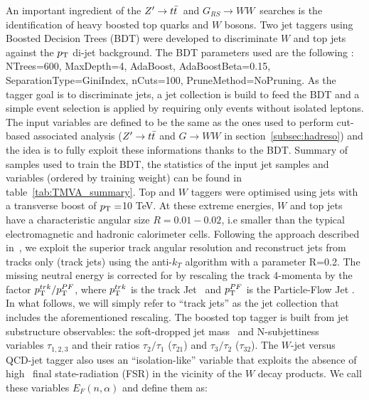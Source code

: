 \documentclass{cernrep}
\newcommand*{\zptt}{\ensuremath{Z^{\prime} \rightarrow \ttbar}}
\newcommand*{\rsg}{\ensuremath{G_{RS} \rightarrow WW}}
\begin{document}
An important ingredient of the \zptt\ and \rsg\ searches is the identification of heavy boosted top quarks and $W$ bosons. Two jet taggers using Boosted Decision Trees (BDT) were developed to discriminate $W$ and top jets against the $p_{\text{T}}$ di-jet background.
\newline
The BDT parameters used are the following : NTrees=600, MaxDepth=4, AdaBoost, AdaBoostBeta=0.15, SeparationType=GiniIndex, nCuts=100, PruneMethod=NoPruning. As the tagger goal is to discriminate jets, a jet collection is build to feed the BDT and a simple event selection is applied by requiring only events without isolated leptons.
The input variables are defined to be the same as the ones used to perform cut-based associated analysis ($Z^{\prime} \rightarrow t\bar{t}$ and $G \rightarrow WW$ in section~\ref{subsec:hadreso}) and the idea is to fully exploit these informations thanks to the BDT. Summary of samples used to train the BDT, the statistics of the input jet samples and variables (ordered by training weight) can be found in table~\ref{tab:TMVA_summary}.
\newline
Top and $W$ taggers were optimised using jets with a transverse boost of $p_{\text{T}}=$10 TeV. At these extreme energies, $W$ and top jets have a characteristic angular size $R=0.01-0.02$, i.e smaller than the typical electromagnetic and hadronic calorimeter cells. Following the approach described in~\cite{Larkoski:2015yqa}, we exploit the superior track angular resolution and reconstruct jets from tracks only (track jets) using the anti-$k_T$ algorithm with a parameter R=0.2. The missing neutral energy is corrected for by rescaling the track 4-momenta by the factor $p_{\text{T}}^{trk}/p_{\text{T}}^{PF}$, where $p_{\text{T}}^{trk}$ is the track Jet \pt\ and $p_{\text{T}}^{PF}$ is the Particle-Flow Jet \pT. In what follows, we will simply refer to ``track jets'' as the jet collection that includes the aforementioned rescaling.
\newline
The boosted top tagger is built from jet substructure observables: the soft-dropped jet mass~\cite{Larkoski:2014wba} and N-subjettiness~\cite{Thaler:2010tr} variables $\tau_{1,2,3}$ and their ratios $\tau_{2}/\tau_{1}$ ($\tau_{21}$) and $\tau_{3}/\tau_{2}$ ($\tau_{32}$). The $W$-jet versus QCD-jet tagger also uses an ``isolation-like'' variable that exploits the absence of high \pt\ final state-radiation (FSR) in the vicinity of the $W$ decay products. We call these variables $E_{F}(n,\alpha)$ and define them as:
\end{document}
